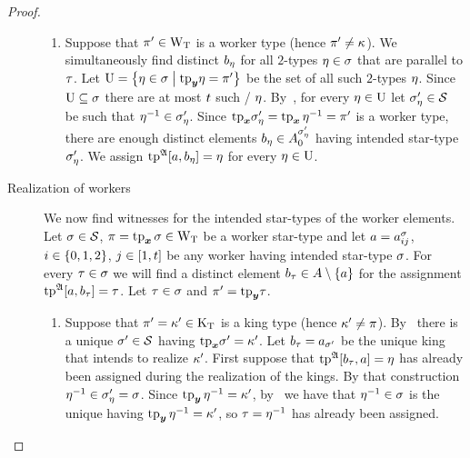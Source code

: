 \begin{proof}
\begin{description}
\begin{enumerate}
  \item
  Suppose that ${\pi'} \in {\mathrm{W}}_{\mathrm{T}}$ is a worker type (hence ${\pi'} \neq \kappa$).
  We simultaneously find distinct $b_{\eta}$ for all $2$-types $\eta\in\sigma$
  that are parallel to $\tau$.
  Let $\mathrm{U} = \left\{\eta \in \sigma\mathrel{}\middle|\mathrel{}\mathrm{tp}_{\bm{y}}\eta = {\pi'}\right\}$ be the set of all
  such $2$-types $\eta$.
  Since $\mathrm{U} \subseteq \sigma$ there are at most $t$ such \twotypes/ $\eta$.
  By~, for every $\eta \in \mathrm{U}$ let $\sigma'_\eta \in \mathcal{S}$ be
  such that $\eta^{-1} \in \sigma'_\eta$.
  Since $\mathrm{tp}_{\bm{x}}{\sigma_{\eta}'} = \operatorname{tp}_{\bm{x}}\eta^{-1} = {\pi'}$ is a worker type, there
  are enough distinct elements $b_{\eta} \in A^{{\sigma_{\eta}'}}_{0}$ having
  intended star-type ${\sigma_{\eta}'}$.
  We assign $\operatorname{tp}^{\mathfrak{A}}[a,b_{\eta}] = \eta$ for every $\eta \in \mathrm{U}$.
  \end{enumerate}
  \item[Realization of workers]
  We now find witnesses for the intended star-types of the worker elements.
  Let $\sigma \in \mathcal{S}$, $\pi = \operatorname{tp}_{\bm{x}}\sigma \in {\mathrm{W}}_{\mathrm{T}}$ be a worker star-type 
  and let $a = a^{\sigma}_{i j}$, $i \in \left\{0,1,2\right\}$, $j \in [1,t]$ be
  any worker having intended star-type $\sigma$.
  For every $\tau\in\sigma$ we will find a distinct element $b_{\tau} \in
  A \setminus \left\{a\right\}$ for the assignment $\operatorname{tp}^{\mathfrak{A}}[a,b_{\tau}] = \tau$.
  Let $\tau\in\sigma$ and ${\pi'} = \mathrm{tp}_{\bm{y}}\tau$.
  \begin{enumerate}
    \item 
    Suppose that ${\pi'} = {\kappa'} \in {\mathrm{K}}_{\mathrm{T}}$ is a king type (hence
    ${\kappa'} \neq \pi$).
    By~ there is a unique ${\sigma'}\in\mathcal{S}$
    having $\mathrm{tp}_{\bm{x}}{\sigma'} = {\kappa'}$.
    Let $b_{\tau} = a_{{\sigma'}}$ be the unique king that intends to realize
    ${\kappa'}$. 
    First suppose that $\operatorname{tp}^{\mathfrak{A}}[b_{\tau},a] = \eta$ has already
    been assigned during the realization of the kings.
    By that construction $\eta^{-1} \in \sigma'_\eta = \sigma$.
    Since $\operatorname{tp}_{\bm{y}}\eta^{-1} = {\kappa'}$, by~ we have that
    $\eta^{-1} \in \sigma$ is the unique having $\operatorname{tp}_{\bm{y}}\eta^{-1} = {\kappa'}$, so
    $\tau = \eta^{-1}$ has already been assigned.
    

\end{enumerate}
\end{description}
\end{proof}
